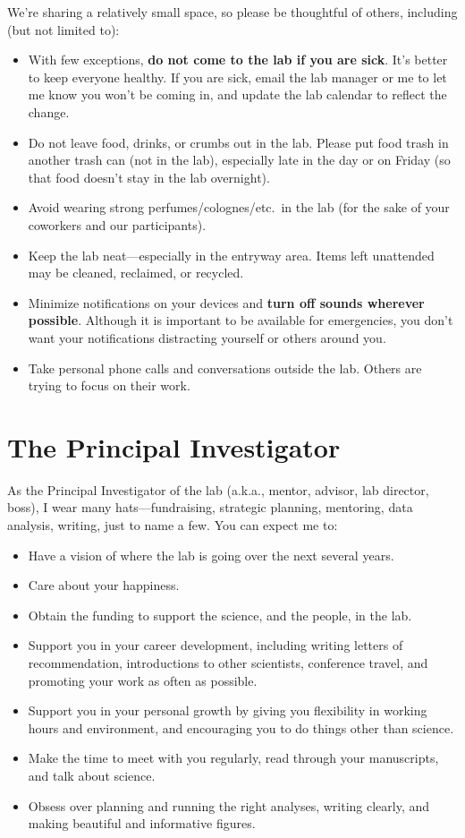\documentclass[letterpaper,11pt,oneside]{memoir}
\begin{document}
We're sharing a relatively small space, so please be thoughtful of others, including (but not limited to):

\begin{itemize}
\item With few exceptions, \textbf{do not come to the lab if you are sick}. It's better to keep everyone healthy. If you are sick, email the lab manager or me to let me know you won't be coming in, and update the lab calendar to reflect the change.
\item Do not leave food, drinks, or crumbs out in the lab. Please put food trash in another trash can (not in the lab), especially late in the day or on Friday (so that food doesn't stay in the lab overnight).
\item Avoid wearing strong perfumes/colognes/etc.\ in the lab (for the sake of your coworkers and our participants).
\item Keep the lab neat---especially in the entryway area. Items left unattended may be cleaned, reclaimed, or recycled.
\item Minimize notifications on your devices and \textbf{turn off sounds wherever possible}. Although it is important to be available for emergencies, you don't want your notifications distracting yourself or others around you.
\item Take personal phone calls and conversations outside the lab. Others are trying to focus on their work.
\end{itemize}


\section{The Principal Investigator}

As the Principal Investigator of the lab (a.k.a., mentor, advisor, lab director, boss), I wear many hats---fundraising, strategic planning, mentoring, data analysis, writing, just to name a few. You can expect me to:

\begin{itemize}
\item Have a vision of where the lab is going over the next several years.
\item Care about your happiness.
\item Obtain the funding to support the science, and the people, in the lab.
\item Support you in your career development, including writing letters of recommendation, introductions to other scientists, conference travel, and promoting your work as often as possible.
\item Support you in your personal growth by giving you flexibility in working hours and environment, and encouraging you to do things other than science.
\item Make the time to meet with you regularly, read through your manuscripts, and talk about science.
\item Obsess over planning and running the right analyses, writing clearly, and making beautiful and informative figures.
\end{itemize}
\end{document}
